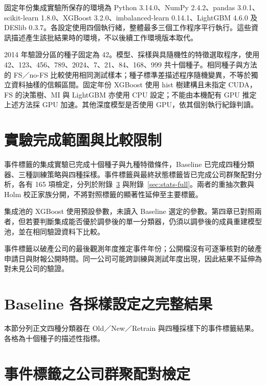 

固定年份集成實驗所保存的環境為 Python 3.14.0、NumPy 2.4.2、pandas 3.0.1、scikit-learn 1.8.0、XGBoost 3.2.0、imbalanced-learn 0.14.1、LightGBM 4.6.0 及 DESlib 0.3.7。各設定使用四個執行緒，整體最多三個工作程序平行執行。這些資訊描述產生該批結果時的環境，不以後續工作環境版本取代。

2014 年驗證分區的種子固定為 42。模型、採樣與具隨機性的特徵選取程序，使用 42、123、456、789、2024、7、21、84、168、999 共十個種子。相同種子與方法的 FS／no-FS 比較使用相同測試樣本；種子標準差描述程序隨機變異，不等於獨立資料抽樣的信賴區間。固定年份 XGBoost 使用 hist 樹建構且未指定 CUDA，FS 的決策樹、MI 與 LightGBM 亦使用 CPU 設定；不能由本機配有 GPU 推定上述方法採 GPU 加速。其他深度模型是否使用 GPU，依其個別執行紀錄判讀。

\section{實驗完成範圍與比較限制}\label{sec:method-evidence}

事件標籤的集成實驗已完成十個種子與九種特徵條件，Baseline 已完成四種分類器、三種訓練策略與四種採樣。事件標籤與最終狀態標籤皆已完成公司群聚配對分析，各有 165 項檢定，分列於附錄~\ref{sec:event-stats-full} 與附錄~\ref{sec:stats-full}。兩者的重抽次數與 Holm 校正家族分開，不將對照標籤的顯著性延伸至主要標籤。

集成池的 XGBoost 使用預設參數，未讀入 Baseline 選定的參數。第四章已對照兩者，但若要判斷集成能否優於調參後的單一分類器，仍須以調參後的成員重建模型池，並在相同驗證資料下比較。

事件標籤以破產公司的最後觀測年度推定事件年份；公開檔沒有可逐筆核對的破產申請日與財報公開時間。同一公司可能跨訓練與測試年度出現，因此結果不延伸為對未見公司的驗證。

\clearpage
\section{Baseline 各採樣設定之完整結果}\label{sec:results-baseline-full}

本節分列正文四種分類器在 Old／New／Retrain 與四種採樣下的事件標籤結果。各格為十個種子的描述性指標。



\section{事件標籤之公司群聚配對檢定}\label{sec:event-stats-full}

